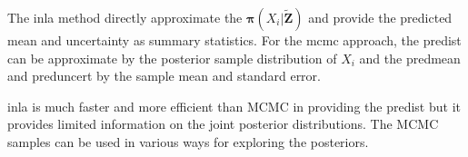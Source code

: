 \documentclass[a4paper,12pt]{article}
\begin{document}
The \acrshort{inla} method directly approximate the $\bm{\pi}(X_i | \bm{\tilde{Z}})$ and provide the predicted mean and uncertainty as summary statistics. For the \acrshort{mcmc} approach, the \gls{predist} can be approximate by the posterior sample distribution of $X_i$ and the \gls{predmean} and \gls{preduncert} by the sample mean and standard error.

\acrshort{inla} is much faster and more efficient than MCMC in providing the \gls{predist} but it provides limited information on the joint posterior distributions. The MCMC samples can be used in various ways for exploring the posteriors.



\clearpage
 
\printglossary[type=\acronymtype]
 
\printglossary
 
\end{document}
